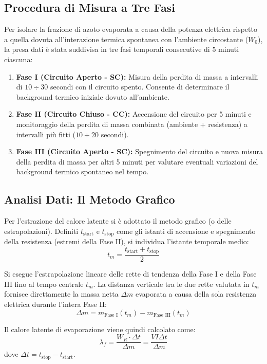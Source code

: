\documentclass[a4paper,12pt]{article}
\begin{document}
\subsection{Procedura di Misura a Tre Fasi}
Per isolare la frazione di azoto evaporata a causa della potenza elettrica rispetto a quella dovuta all'interazione termica spontanea con l'ambiente circostante ($W_0$), la presa dati è stata suddivisa in tre fasi temporali consecutive di 5 minuti ciascuna:
\begin{enumerate}
    \item \textbf{Fase I (Circuito Aperto - SC):} Misura della perdita di massa a intervalli di $10 \div 30$ secondi con il circuito spento. Consente di determinare il background termico iniziale dovuto all'ambiente.
    \item \textbf{Fase II (Circuito Chiuso - CC):} Accensione del circuito per 5 minuti e monitoraggio della perdita di massa combinata (ambiente + resistenza) a intervalli più fitti ($10 \div 20$ secondi).
    \item \textbf{Fase III (Circuito Aperto - SC):} Spegnimento del circuito e nuova misura della perdita di massa per altri 5 minuti per valutare eventuali variazioni del background termico spontaneo nel tempo.
\end{enumerate}

\subsection{Analisi Dati: Il Metodo Grafico}
Per l'estrazione del calore latente si è adottato il metodo grafico (o delle estrapolazioni). Definiti $t_{\text{start}}$ e $t_{\text{stop}}$ come gli istanti di accensione e spegnimento della resistenza (estremi della Fase II), si individua l'istante temporale medio:
\begin{equation*}
t_m = \frac{t_{\text{start}} + t_{\text{stop}}}{2}
\end{equation*}

Si esegue l'estrapolazione lineare delle rette di tendenza della Fase I e della Fase III fino al tempo centrale $t_m$. La distanza verticale tra le due rette valutata in $t_m$ fornisce direttamente la massa netta $\Delta m$ evaporata a causa della sola resistenza elettrica durante l'intera Fase II:
\begin{equation*}
\Delta m = m_{\text{Fase I}}(t_m) - m_{\text{Fase III}}(t_m)
\end{equation*}

Il calore latente di evaporazione viene quindi calcolato come:
\begin{equation*}
\lambda_f = \frac{W_R \cdot \Delta t}{\Delta m} = \frac{V I \Delta t}{\Delta m}
\end{equation*}
dove $\Delta t = t_{\text{stop}} - t_{\text{start}}$.
\end{document}
